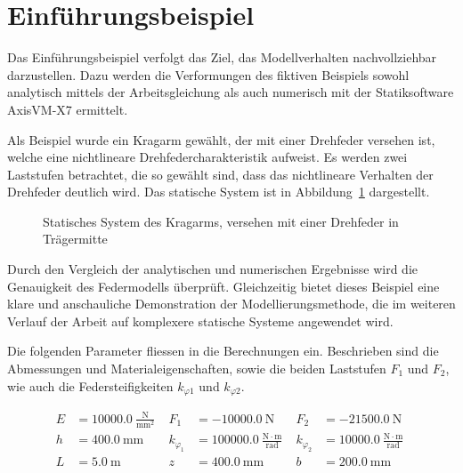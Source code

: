 \documentclass[
  11pt,
  letterpaper,
]{scrreprt}
\begin{document}
\section{Einführungsbeispiel}\label{einfuxfchrungsbeispiel}

Das Einführungsbeispiel verfolgt das Ziel, das Modellverhalten
nachvollziehbar darzustellen. Dazu werden die Verformungen des fiktiven
Beispiels sowohl analytisch mittels der Arbeitsgleichung als auch
numerisch mit der Statiksoftware AxisVM-X7 ermittelt.

Als Beispiel wurde ein Kragarm gewählt, der mit einer Drehfeder versehen
ist, welche eine nichtlineare Drehfedercharakteristik aufweist. Es
werden zwei Laststufen betrachtet, die so gewählt sind, dass das
nichtlineare Verhalten der Drehfeder deutlich wird. Das statische System
ist in Abbildung~\ref{fig-kragarm-feder} dargestellt.

\begin{figure}[H]


\caption{\label{fig-kragarm-feder}Statisches System des Kragarms,
versehen mit einer Drehfeder in Trägermitte}

\end{figure}%

Durch den Vergleich der analytischen und numerischen Ergebnisse wird die
Genauigkeit des Federmodells überprüft. Gleichzeitig bietet dieses
Beispiel eine klare und anschauliche Demonstration der
Modellierungsmethode, die im weiteren Verlauf der Arbeit auf komplexere
statische Systeme angewendet wird.

Die folgenden Parameter fliessen in die Berechnungen ein. Beschrieben
sind die Abmessungen und Materialeigenschaften, sowie die beiden
Laststufen \(F_1\) und \(F_2\), wie auch die Federsteifigkeiten
\(k_{\varphi1}\) und \(k_{\varphi2}\).

$$
\begin{aligned}
E &= 10000.0\ \frac{\mathrm{N}}{\mathrm{mm}^{2}} \; 
 &F_{1} &= -10000.0\ \mathrm{N} \; 
 &F_{2} &= -21500.0\ \mathrm{N} \; 
\\[11pt]
 h &= 400.0\ \mathrm{mm} \; 
 &k_{\varphi_{1}} &= 100000.0\ \frac{\mathrm{N} \cdot \mathrm{m}}{\mathrm{rad}} \; 
 &k_{\varphi_{2}} &= 10000.0\ \frac{\mathrm{N} \cdot \mathrm{m}}{\mathrm{rad}} \; 
\\[11pt]
 L &= 5.0\ \mathrm{m} \; 
 &z &= 400.0\ \mathrm{mm} \; 
 &b &= 200.0\ \mathrm{mm} \; 
\\[11pt]
\end{aligned}
$$
\end{document}
